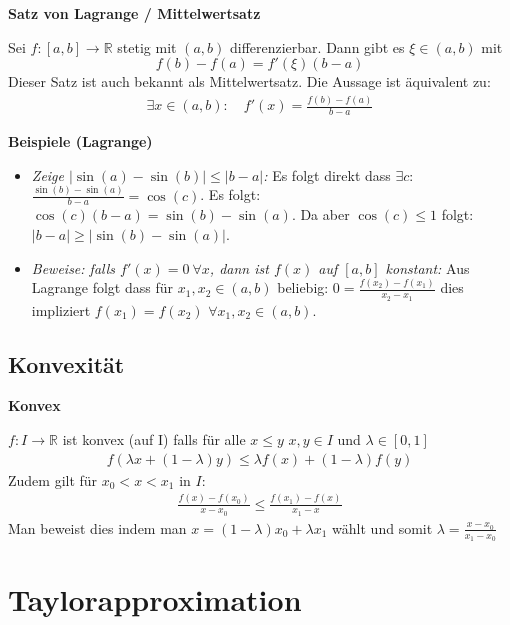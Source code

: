 \documentclass[25pt]{sciposter}
\newcommand{\R}{\mathbb{R}}
\newenvironment{method}[1]{\begin{mdframed}[backgroundcolor=blue!10,innertopmargin=15pt, innerbottommargin=15pt, nobreak=true]
		\textbf{#1 }
	}
	{ 
	\end{mdframed}
}
\begin{document}
\begin{multicols}{3}
\begin{method}{Satz von Lagrange / Mittelwertsatz}
	Sei $f:[a,b] \to \R$ stetig mit $(a,b)$ differenzierbar. Dann gibt es $\xi \in (a,b)$ mit $$f(b) - f(a) = f'(\xi) (b-a)$$
	Dieser Satz ist auch bekannt als Mittelwertsatz. Die Aussage ist äquivalent zu: 
	\begin{align*}
		\exists x \in (a,b) : \quad f'(x) = \frac{f(b) -f(a) }{b-a}
	\end{align*}
\end{method}
\textbf{Beispiele (Lagrange)}
\begin{itemize}
	\item \textit{Zeige $|\sin(a) - \sin(b)| \leq |b-a|$:} Es folgt direkt dass $\exists c$: $\frac{\sin(b)- \sin(a)}{b-a} = \cos(c)$. Es folgt: $\cos(c) (b-a) = \sin(b) - \sin(a)$. Da aber $\cos(c) \leq 1$ folgt:
	$|b-a| \geq |\sin(b) - \sin(a)|$.
	\item \textit{Beweise: falls $f'(x) = 0 \ \forall x$, dann ist $f(x)$ auf $[a,b]$ konstant:} Aus Lagrange folgt dass für $x_1,x_2\in (a,b)$ beliebig: $0 = \frac{f(x_2)-f(x_1)}{x_2-x_1}$ dies impliziert $f(x_1) = f(x_2)$ $\forall x_1,x_2 \in (a,b)$.
\end{itemize}

\subsection*{Konvexität}

\begin{method}{Konvex}
	$f : I \to \R$ ist konvex (auf I) falls für alle $x \leq y$ $x,y \in I$ und $\lambda \in [0,1]$
	\begin{align*}
	f(\lambda x + (1-\lambda)y) \leq \lambda f(x) + (1-\lambda)f(y)
	\end{align*}
	Zudem gilt für $x_0 < x< x_1$ in $I$:
	\begin{align*}
	 \frac{f(x) - f(x_0)}{x-x_0} \leq \frac{f(x_1) - f(x)}{x_1 - x}
	\end{align*}
	Man beweist dies indem man $x = (1-\lambda) x_0 + \lambda x_1$ wählt und somit $\lambda = \frac{x-x_0}{x_1 - x_0}$
\end{method}

\section*{Taylorapproximation}


\end{multicols}
\end{document}
